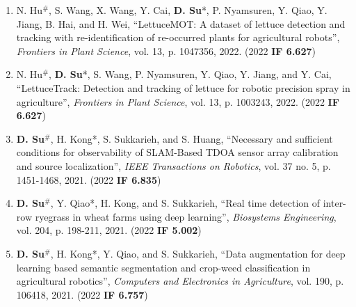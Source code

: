 \documentclass[margin,line]{res}
\begin{document}
\begin{resume}
\begin{enumerate}
\item N. Hu$^{\#}$, S. Wang, X. Wang, Y. Cai, \textbf{D. Su}*, P. Nyamsuren, Y. Qiao, Y. Jiang, B. Hai, and H. Wei, ``LettuceMOT: A dataset of lettuce detection and tracking with re-identification of re-occurred plants for agricultural robots'', \textit{Frontiers in Plant Science}, vol. 13, p. 1047356, 2022. (2022 \textbf{IF 6.627})

\item N. Hu$^{\#}$, \textbf{D. Su}*, S. Wang, P. Nyamsuren, Y. Qiao, Y. Jiang, and Y. Cai, ``LettuceTrack: Detection and tracking of lettuce for robotic precision spray in agriculture'', \textit{Frontiers in Plant Science}, vol. 13, p. 1003243, 2022. (2022 \textbf{IF 6.627})


\item \textbf{D. Su}$^{\#}$, H. Kong*, S. Sukkarieh, and S. Huang, ``Necessary and sufficient conditions for observability of SLAM-Based TDOA sensor array calibration and source localization'', {\it IEEE Transactions on Robotics}, vol. 37 no. 5, p. 1451-1468, 2021. (2022 \textbf{IF 6.835})

\item \textbf{D. Su}$^{\#}$, Y. Qiao*, H. Kong, and S. Sukkarieh, ``Real time detection of inter-row ryegrass in wheat farms using deep learning'', {\it Biosystems Engineering}, vol. 204, p. 198-211, 2021. (2022 \textbf{IF 5.002})

\item \textbf{D. Su}$^{\#}$, H. Kong*, Y. Qiao, and S. Sukkarieh, ``Data augmentation for deep learning based semantic segmentation and crop-weed classification in agricultural robotics'', {\it Computers and Electronics in Agriculture}, vol. 190, p. 106418, 2021. (2022 \textbf{IF 6.757})


\end{enumerate}
\end{resume}
\end{document}
